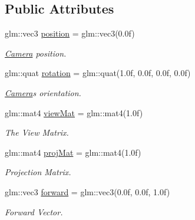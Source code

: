 \subsection*{Public Attributes}
\begin{DoxyCompactItemize}
\item 
\mbox{\label{class_camera_a04b5db2c530d8630660e8cfb93a4b3b5}} 
glm\+::vec3 \mbox{\hyperlink{class_camera_a04b5db2c530d8630660e8cfb93a4b3b5}{position}} = glm\+::vec3(0.\+0f)
\begin{DoxyCompactList}\small\item\em \mbox{\hyperlink{class_camera}{Camera}} position. \end{DoxyCompactList}\item 
\mbox{\label{class_camera_a140b9462fb421bc44044b4bb7ba65959}} 
glm\+::quat \mbox{\hyperlink{class_camera_a140b9462fb421bc44044b4bb7ba65959}{rotation}} = glm\+::quat(1.\+0f, 0.\+0f, 0.\+0f, 0.\+0f)
\begin{DoxyCompactList}\small\item\em \mbox{\hyperlink{class_camera}{Camera}}\textquotesingle{}s orientation. \end{DoxyCompactList}\item 
\mbox{\label{class_camera_aaad8aac8f0fdb3f9c17208b85214f4d7}} 
glm\+::mat4 \mbox{\hyperlink{class_camera_aaad8aac8f0fdb3f9c17208b85214f4d7}{view\+Mat}} = glm\+::mat4(1.\+0f)
\begin{DoxyCompactList}\small\item\em The View Matrix. \end{DoxyCompactList}\item 
\mbox{\label{class_camera_aac4ef81728f68a571955d72639f90f24}} 
glm\+::mat4 \mbox{\hyperlink{class_camera_aac4ef81728f68a571955d72639f90f24}{proj\+Mat}} = glm\+::mat4(1.\+0f)
\begin{DoxyCompactList}\small\item\em Projection Matrix. \end{DoxyCompactList}\item 
\mbox{\label{class_camera_aa98ee9f3a770f03ebca0cde9f7b8ab50}} 
glm\+::vec3 \mbox{\hyperlink{class_camera_aa98ee9f3a770f03ebca0cde9f7b8ab50}{forward}} = glm\+::vec3(0.\+0f, 0.\+0f, 1.\+0f)
\begin{DoxyCompactList}\small\item\em Forward Vector. \end{DoxyCompactList}\item 

\end{DoxyCompactItemize}
